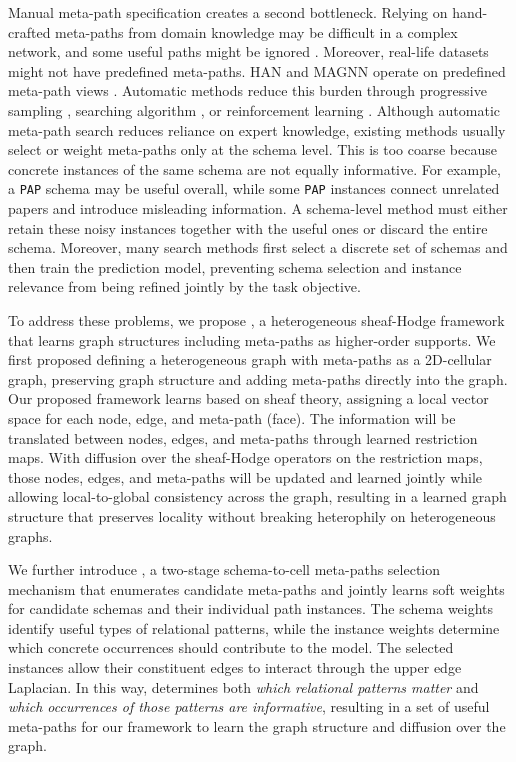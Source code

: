 Manual meta-path specification creates a second bottleneck. Relying on hand-crafted meta-paths from domain knowledge may be difficult in a complex network, and some useful paths might be ignored \cite{zhong2022pmhgnn,li2024lmsps}. Moreover, real-life datasets might not have predefined meta-paths.
HAN and MAGNN operate on predefined meta-path views \cite{wang2019han,fu2020magnn}. Automatic
methods reduce this burden through progressive sampling \cite{li2024lmsps}, searching algorithm \cite{zhang2026mctshgnn,li2023pmmm,li2026amphgnas,sun2025hgsearch}, or reinforcement learning
\cite{zhong2022pmhgnn}.
Although automatic meta-path search reduces reliance on expert knowledge, existing methods usually select or weight meta-paths only at the schema level. This is too coarse because concrete instances of the same schema are not equally informative. For example, a \texttt{PAP} schema may be useful overall, while some \texttt{PAP} instances connect unrelated papers and introduce misleading information. A schema-level method must either retain these noisy instances together with the useful ones or discard the entire schema. Moreover, many search methods first select a discrete set of schemas and then train the prediction model, preventing schema selection and instance relevance from being refined jointly by the task objective.

To address these problems, we propose
\method{}, a heterogeneous sheaf-Hodge framework that learns graph structures including meta-paths as higher-order supports. We first proposed defining a heterogeneous graph with meta-paths as a 2D-cellular graph, preserving graph structure and adding meta-paths directly into the graph. Our proposed framework learns based on sheaf theory, assigning a local vector space for each node, edge, and meta-path (face). The information will be translated between nodes, edges, and meta-paths through learned restriction maps. With diffusion over the sheaf-Hodge operators on the restriction maps, those nodes, edges, and meta-paths will be updated and learned jointly while allowing local-to-global consistency across the graph, resulting in a learned graph structure that preserves locality without breaking heterophily on heterogeneous graphs.

We further introduce \ampss{}, a two-stage schema-to-cell meta-paths selection mechanism that enumerates candidate meta-paths and jointly learns soft weights
for candidate schemas and their individual path instances. The schema weights identify useful
types of relational patterns, while the instance weights determine which concrete occurrences
should contribute to the model. The selected instances allow their constituent edges to interact through
the upper edge Laplacian. In this way, \ampss{} determines both \emph{which relational patterns
matter} and \emph{which occurrences of those patterns are informative}, resulting in a set of useful meta-paths for our \method{} framework to learn the graph structure and diffusion over the graph.

